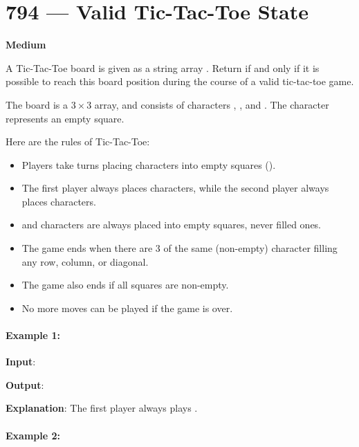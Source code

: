 \section{794 --- Valid Tic-Tac-Toe State}

\textbf{Medium}

A Tic-Tac-Toe board is given as a string array . Return  if and only if it is possible to reach this board position during the course of a valid tic-tac-toe game.

The board is a $ 3 \times 3 $ array, and consists of characters , , and .  The  character represents an empty square.

Here are the rules of Tic-Tac-Toe:

\begin{itemize}
\item Players take turns placing characters into empty squares ().

\item The first player always places  characters, while the second player always places  characters.

\item {} and  characters are always placed into empty squares, never filled ones.

\item The game ends when there are 3 of the same (non-empty) character filling any row, column, or diagonal.

\item The game also ends if all squares are non-empty.

\item No more moves can be played if the game is over.
\end{itemize}

\paragraph{Example 1:}

\begin{flushleft}
\textbf{Input}: 

\textbf{Output}: 

\textbf{Explanation}: The first player always plays .
\end{flushleft}

\paragraph{Example 2:}

